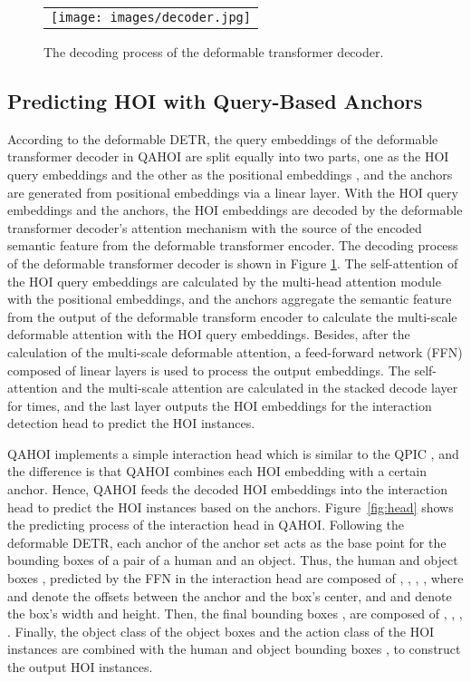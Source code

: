 \documentclass[10pt,twocolumn,letterpaper]{article}
\begin{document}
\begin{figure}
  \centering
  \begin{tabular}{c}
     \texttt{[image: images/decoder.jpg]}
  \end{tabular}
  \caption{The decoding process of the deformable transformer decoder.}
  \label{fig:decoder}
\end{figure}
\subsection{Predicting HOI with Query-Based Anchors}
According to the deformable DETR,
the query embeddings of the deformable transformer decoder in QAHOI are split equally into two parts,
one as the HOI query embeddings  and the other as the positional embeddings ,
and the anchors  are generated from positional embeddings  via a linear layer.
With the HOI query embeddings and the anchors, the HOI embeddings  are decoded by the deformable transformer decoder's attention mechanism with the source of the encoded semantic feature from the deformable transformer encoder. 
The decoding process of the deformable transformer decoder is shown in Figure \ref{fig:decoder}.
The self-attention of the HOI query embeddings are calculated by the multi-head attention module \cite{waswani2017attention} with the positional embeddings,
and the anchors aggregate the semantic feature from the output of the deformable transform encoder
to calculate the multi-scale deformable attention \cite{zhu2020deformable} with the HOI query embeddings.
Besides, after the calculation of the multi-scale deformable attention,
a feed-forward network (FFN) composed of linear layers is used to process the output embeddings.
The self-attention and the multi-scale attention are calculated in the stacked decode layer for  times,
and the last layer outputs the HOI embeddings for the interaction detection head to predict the HOI instances.

QAHOI implements a simple interaction head which is similar to the QPIC \cite{tamura2021qpic},
and the difference is that QAHOI combines each HOI embedding with a certain anchor.
Hence, QAHOI feeds the decoded HOI embeddings into the interaction head to predict the HOI instances based on the anchors.
Figure~\ref{fig:head} shows the predicting process of the interaction head in QAHOI.
Following the deformable DETR, each anchor  of the anchor set 
acts as the base point for the bounding boxes of a pair of a human and an object.
Thus, the human and object boxes ,  predicted by the FFN in the interaction head
are composed of , , , ,
where  and  denote the offsets between the anchor and the box's center, and  and  denote the box's width and height.
Then, the final bounding boxes ,  are composed of , , , .
Finally, the object class of the object boxes 
and the action class of the HOI instances 
are combined with the human and object bounding boxes ,  to construct the output HOI instances.
\end{document}
